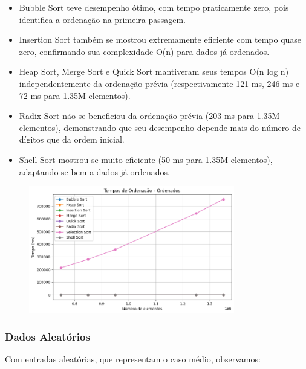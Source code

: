\documentclass[a4paper, 12pt]{article}
\begin{document}
            \begin{itemize}
                \item Bubble Sort teve desempenho ótimo, com tempo praticamente zero, pois identifica a ordenação na primeira passagem.
                \item Insertion Sort também se mostrou extremamente eficiente com tempo quase zero, confirmando sua complexidade O(n) para dados já ordenados.
                \item Heap Sort, Merge Sort e Quick Sort mantiveram seus tempos O(n log n) independentemente da ordenação prévia (respectivamente 121 ms, 246 ms e 72 ms para 1.35M elementos).
                \item Radix Sort não se beneficiou da ordenação prévia (203 ms para 1.35M elementos), demonstrando que seu desempenho depende mais do número de dígitos que da ordem inicial.
                \item Shell Sort mostrou-se muito eficiente (50 ms para 1.35M elementos), adaptando-se bem a dados já ordenados.
            \end{itemize}

            \begin{figure}[ht]
                \centering
                \includegraphics[width=0.8\textwidth]{images/ordenados.png}
            \end{figure}

        \subsubsection{Dados Aleatórios}
            Com entradas aleatórias, que representam o caso médio, observamos:
\end{document}
